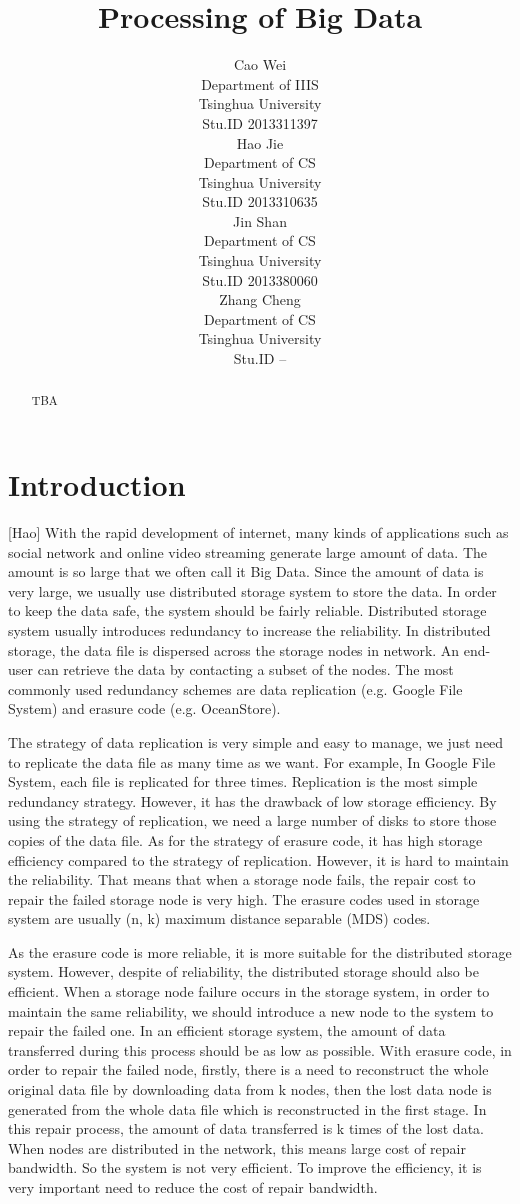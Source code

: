 \documentclass{article} %
\title{Processing of Big Data}
\author{
Cao Wei \\
Department of IIIS\\
Tsinghua University\\
Stu.ID 2013311397 \\
\And
Hao Jie \\
Department of CS\\
Tsinghua University\\
Stu.ID 2013310635 \\
\And
Jin Shan \\
Department of CS\\
Tsinghua University\\
Stu.ID 2013380060 \\
\And
Zhang Cheng \\
Department of CS\\
Tsinghua University\\
Stu.ID -- \\
}
\begin{document}
\maketitle

\begin{abstract}
TBA
\end{abstract}

\section{Introduction}
[Hao] With the rapid development of internet, many kinds of applications such as social network and online video streaming generate large amount of data. The amount is so large that we often call it Big Data. Since the amount of data is very large, we usually use distributed storage system to store the data. In order to keep the data safe, the system should be fairly reliable. Distributed storage system usually introduces redundancy to increase the reliability. In distributed storage, the data file is dispersed across the storage nodes in network. An end-user can retrieve the data by contacting a subset of the nodes. The most commonly used redundancy schemes are data replication (e.g. Google File System) and erasure code (e.g. OceanStore).

The strategy of data replication is very simple and easy to manage, we just need to replicate the data file as many time as we want. For example, In Google File System, each file is replicated for three times. Replication is the most simple redundancy strategy. However, it has the drawback of low storage efficiency. By using the strategy of replication, we need a large number of disks to store those copies of the data file. As for the strategy of erasure code, it has high storage efficiency compared to the strategy of replication. However, it is hard to maintain the reliability. That means that when a storage node fails, the repair cost to repair the failed storage node is very high. The erasure codes used in storage system are usually (n, k) maximum distance separable (MDS) codes.

As the erasure code is more reliable, it is more suitable for the distributed storage system. However, despite of reliability, the distributed storage should also be efficient. When a storage node failure occurs in the storage system, in order to maintain the same reliability, we should introduce a new node to the system to repair the failed one. In an efficient storage system, the amount of data transferred during this process should be as low as possible. With erasure code, in order to repair the failed node, firstly, there is a need to reconstruct the whole original data file by downloading data from k nodes, then the lost data node is generated from the whole data file which is reconstructed in the first stage. In this repair process, the amount of data transferred is k times of the lost data. When nodes are distributed in the network, this means large cost of repair bandwidth. So the system is not very efficient. To improve the efficiency, it is very important need to reduce the cost of repair bandwidth.
      
\end{document}
